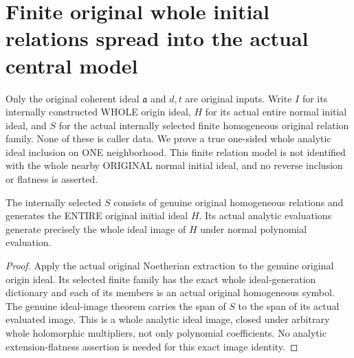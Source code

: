 \section{Finite original whole initial relations spread into the actual central model}
Only the original coherent ideal $\mathfrak a$ and $d,t$ are original inputs.
Write $I$ for its internally constructed WHOLE origin ideal, $H$ for its
actual entire normal initial ideal, and $S$ for the actual internally selected
finite homogeneous original relation family. None of these is caller data.
We prove a true one-sided whole analytic ideal inclusion on ONE neighborhood.
This finite relation model is not identified with the whole nearby ORIGINAL
normal initial ideal, and no reverse inclusion or flatness is asserted.

\begin{theorem}
\label{hir:relative-normal-deformation-finite-original-extension}
\leanok
{}
The internally selected $S$ consists of genuine original homogeneous relations
and generates the ENTIRE original initial ideal $H$. Its actual analytic
evaluations generate precisely the whole ideal image of $H$ under normal
polynomial evaluation.
\end{theorem}
\begin{proof}
Apply the actual original Noetherian extraction to the genuine original
origin ideal. Its selected finite family has the exact whole ideal-generation
dictionary and each of its members is an actual original homogeneous symbol.
The genuine ideal-image theorem carries the span of $S$ to the span of its
actual evaluated image. This is a whole analytic ideal image, closed under
arbitrary whole holomorphic multipliers, not only polynomial coefficients.
No analytic extension-flatness assertion is needed for this exact image identity.
\end{proof}

